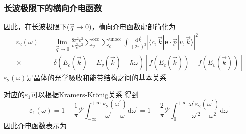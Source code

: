 \frame
{
	\frametitle{长波极限下的横向介电函数}
因此，在长波极限下($\vec q\rightarrow0$)，横向介电函数虚部简化为
\begin{displaymath}
	\begin{aligned}
		\varepsilon_2(\omega)=&\lim_{\vec q\rightarrow0}\frac{8\pi^2e^2}{m_e^2\omega^2}\sum_{v}^{\mathrm{occ}}\sum_{c}^{\mathrm{unocc}}\int\frac{\mathrm{d}\vec k}{(2\pi)^3}|\langle c,\vec k|\mathbf{e}\cdot\vec p|v,\vec k\rangle|^2\\
		\times&\delta(E_c(\vec k)-E_v(\vec k)-\hbar\omega)[f(E_c(\vec k))-f(E_v(\vec k))]
	\end{aligned}
  \label{eq:optic-varepsilon_2}
\end{displaymath}
$\varepsilon_2(\omega)$是晶体的光学吸收和能带结构之间的基本关系

对应的$\varepsilon_1$可以根据\textrm{Kramers-Kr\"onig}关系%
得到
\begin{displaymath}
	\varepsilon_1(\omega)=1+\frac1{\pi}\mathscr{P}\int_{-\infty}^{+\infty}\frac{\varepsilon_2(\omega^{\prime})}{\omega^{\prime}-\omega}\textrm{d}\omega^{\prime}=1+\frac2{\pi}\mathscr{P}\int_0^{+\infty}\frac{\omega^{\prime}\varepsilon_2(\omega^{\prime})}{\omega^{\prime2}-\omega^2}\textrm{d}\omega^{\prime}
  \label{eq:optic-varepsilon_1}
\end{displaymath}
因此介电函数表示为
{\fontsize{9.5pt}{6.2pt}}
}

